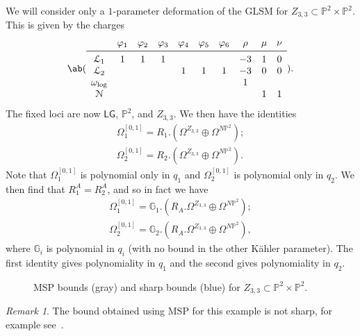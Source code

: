 \documentclass[10pt,oldfontcommands,oneside]{memoir}
\theoremstyle{definition}
\theoremstyle{remark}
\newtheorem{rmk}[thm]{Remark}
\theoremstyle{plain}
\theoremstyle{definition}
\theoremstyle{remark}
\newcommand{\G}{\mathbb{G}}
\renewcommand{\P}{\mathbb{P}}
\newcommand{\mc}[1]{\mathcal{#1}}
\newcommand{\ms}[1]{\mathsf{#1}}
\newcommand{\1}{\mathbf{1}}
\newcommand{\2}{\mathbf{2}}
\newcommand{\3}{\mathbf{3}}
\newcommand{\LG}{\ms{LG}}
\begin{document}
We will consider only a $1$-parameter deformation of the GLSM for $Z_{3,3} \subset \P^2 \times \P^2$. This is given by the charges
\[ \ab(\begin{array}{cccccccccc}
    & \varphi_1 & \varphi_2 & \varphi_3 & \varphi_4 & \varphi_5 & \varphi_6 & \rho & \mu & \nu \\
    \midrule
    \mc{L}_1 & 1 & 1 & 1 & & & & -3 & 1 & 0 \\
    \mc{L}_2 & & & & 1 & 1 & 1 & -3 & 0 & 0 \\
    \omega_{\log} & & & & & & & 1 & & \\
    \mc{N} & & & & & & & & 1 & 1
\end{array}). \]
The fixed loci are now $\LG$, $\P^2$, and $Z_{3,3}$. We then have the identities
\begin{align*}
    \Omega_1^{[0,1]} = R_1 . (\Omega^{Z_{3,3}} \oplus \Omega^{N\P^2}); \\ 
    \Omega_2^{[0,1]} = R_2 . (\Omega^{Z_{3,3}} \oplus \Omega^{N\P^2}). 
\end{align*}
Note that $\Omega_1^{[0,1]}$ is polynomial only in $q_1$ and $\Omega_2^{[0,1]}$ is polynomial only in $q_2$. We then find that $R_1^A = R_2^A$, and so in fact we have
\begin{align*}
    \Omega_1^{[0,1]} = \G_1 . (R_A. \Omega^{Z_{3,3}} \oplus \Omega^{N\P^2}); \\ 
    \Omega_2^{[0,1]} = \G_2 . (R_A .\Omega^{Z_{3,3}} \oplus \Omega^{N\P^2}), 
\end{align*}
where $\G_i$ is polynomial in $q_i$ (with no bound in the other K\"ahler parameter). The first identity gives polynomiality in $q_1$ and the second gives polynomiality in $q_2$.
    \begin{figure}[htpb]
    \begin{center}
    \end{center}
    \caption{MSP bounds (gray) and sharp bounds (blue) for $Z_{3,3} \subset \P^2 \times \P^2$.}%
    \label{fig:bounds}
    \end{figure}

\begin{rmk}
    The bound obtained using MSP for this example is not sharp, for example see~.
\end{rmk}

\sloppy
\printbibliography
\end{document}
